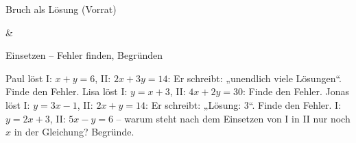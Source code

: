 \begin{aufgabe}{Bruch als Lösung (Vorrat)}
\begin{gleichungsraster}[2]
 & \\
\end{gleichungsraster}
\end{aufgabe}

\begin{aufgabe}{Einsetzen – Fehler finden, Begründen}
\begin{teile}
\teil Paul löst I: $x + y = 6$, II: $2x + 3y = 14$:  Er schreibt: „unendlich viele Lösungen“. Finde den Fehler.
\teil Lisa löst I: $y = x + 3$, II: $4x + 2y = 30$:  Finde den Fehler.
\teil Jonas löst I: $y = 3x - 1$, II: $2x + y = 14$:  Er schreibt: „Lösung: 3“. Finde den Fehler.
\teil I: $y = 2x + 3$, II: $5x - y = 6$ – warum steht nach dem Einsetzen von I in II nur noch $x$ in der Gleichung? Begründe.
\end{teile}
\end{aufgabe}
